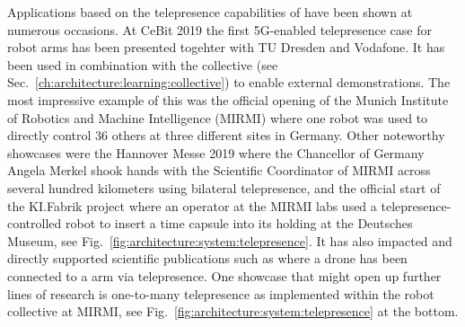 Applications based on the telepresence capabilities of \softwareabbr{} have been shown at numerous occasions.
At CeBit 2019 the first 5G-enabled telepresence case for robot arms has been presented togehter with TU Dresden and Vodafone.
It has been used in combination with the collective (see Sec.~\ref{ch:architecture:learning:collective}) to enable external demonstrations.
The most impressive example of this was the official opening of the Munich Institute of Robotics and Machine Intelligence (MIRMI) where one robot was used to directly control $36$ others at three different sites in Germany.
Other noteworthy showcases were the Hannover Messe 2019 where the Chancellor of Germany Angela Merkel shook hands with the Scientific Coordinator of MIRMI across several hundred kilometers using bilateral telepresence, and the official start of the KI.Fabrik project where an operator at the MIRMI labs used a telepresence-controlled robot to insert a time capsule into its holding at the Deutsches Museum, see Fig.~\ref{fig:architecture:system:telepresence}.
It has also impacted and directly supported scientific publications such as \cite{moortgat2020feeling} where a drone has been connected to a \platformname{} arm via telepresence.
One showcase that might open up further lines of research is one-to-many telepresence as implemented within the robot collective at MIRMI, see Fig.~\ref{fig:architecture:system:telepresence} at the bottom.

